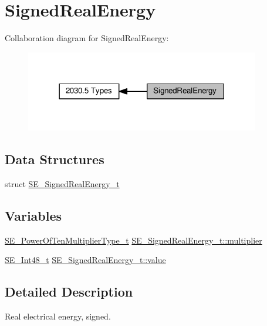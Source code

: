 \hypertarget{group__SignedRealEnergy}{}\section{Signed\+Real\+Energy}
\label{group__SignedRealEnergy}
Collaboration diagram for Signed\+Real\+Energy\+:\nopagebreak
\begin{figure}[H]
\begin{center}
\leavevmode
\includegraphics[width=290pt]{group__SignedRealEnergy}
\end{center}
\end{figure}
\subsection*{Data Structures}
\begin{DoxyCompactItemize}
\item 
struct \hyperlink{structSE__SignedRealEnergy__t}{S\+E\+\_\+\+Signed\+Real\+Energy\+\_\+t}
\end{DoxyCompactItemize}
\subsection*{Variables}
\begin{DoxyCompactItemize}
\item 
\hyperlink{group__PowerOfTenMultiplierType_gaf0317b781dc8dbb9cb6ac4e44a14fdef}{S\+E\+\_\+\+Power\+Of\+Ten\+Multiplier\+Type\+\_\+t} \hyperlink{group__SignedRealEnergy_gad4a20cecc5be12f8890fd35bb178b064}{S\+E\+\_\+\+Signed\+Real\+Energy\+\_\+t\+::multiplier}
\item 
\hyperlink{group__Int48_ga87620025dc9f6c732fa48fcab95861ce}{S\+E\+\_\+\+Int48\+\_\+t} \hyperlink{group__SignedRealEnergy_ga49903bd75921418f4be2e023e5ec502f}{S\+E\+\_\+\+Signed\+Real\+Energy\+\_\+t\+::value}
\end{DoxyCompactItemize}


\subsection{Detailed Description}
Real electrical energy, signed. 

